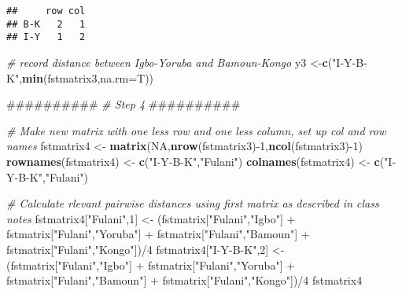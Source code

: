 \documentclass[]{article}
\newenvironment{Shaded}{\begin{snugshade}}{\end{snugshade}}
\newcommand{\KeywordTok}[1]{\textcolor[rgb]{0.13,0.29,0.53}{\textbf{{#1}}}}
\newcommand{\DataTypeTok}[1]{\textcolor[rgb]{0.13,0.29,0.53}{{#1}}}
\newcommand{\DecValTok}[1]{\textcolor[rgb]{0.00,0.00,0.81}{{#1}}}
\newcommand{\StringTok}[1]{\textcolor[rgb]{0.31,0.60,0.02}{{#1}}}
\newcommand{\CommentTok}[1]{\textcolor[rgb]{0.56,0.35,0.01}{\textit{{#1}}}}
\newcommand{\OtherTok}[1]{\textcolor[rgb]{0.56,0.35,0.01}{{#1}}}
\newcommand{\NormalTok}[1]{{#1}}
\begin{document}
\begin{verbatim}
##     row col
## B-K   2   1
## I-Y   1   2
\end{verbatim}

\begin{Shaded}
\begin{Highlighting}[]
\CommentTok{# record distance between Igbo-Yoruba and Bamoun-Kongo}
\NormalTok{y3 <-}\KeywordTok{c}\NormalTok{(}\StringTok{"I-Y-B-K"}\NormalTok{,}\KeywordTok{min}\NormalTok{(fstmatrix3,}\DataTypeTok{na.rm=}\NormalTok{T))}

\NormalTok{##########}
\CommentTok{# Step 4}
\NormalTok{##########}

\CommentTok{# Make new matrix with one less row and one less column, set up col and row names}
\NormalTok{fstmatrix4 <-}\StringTok{ }\KeywordTok{matrix}\NormalTok{(}\OtherTok{NA}\NormalTok{,}\KeywordTok{nrow}\NormalTok{(fstmatrix3)-}\DecValTok{1}\NormalTok{,}\KeywordTok{ncol}\NormalTok{(fstmatrix3)-}\DecValTok{1}\NormalTok{)}
\KeywordTok{rownames}\NormalTok{(fstmatrix4) <-}\StringTok{ }\KeywordTok{c}\NormalTok{(}\StringTok{"I-Y-B-K"}\NormalTok{,}\StringTok{"Fulani"}\NormalTok{)}
\KeywordTok{colnames}\NormalTok{(fstmatrix4) <-}\StringTok{ }\KeywordTok{c}\NormalTok{(}\StringTok{"I-Y-B-K"}\NormalTok{,}\StringTok{"Fulani"}\NormalTok{)}

\CommentTok{# Calculate rlevant pairwise distances using first matrix as described in class notes}
\NormalTok{fstmatrix4[}\StringTok{"Fulani"}\NormalTok{,}\DecValTok{1}\NormalTok{] <-}\StringTok{ }\NormalTok{(fstmatrix[}\StringTok{"Fulani"}\NormalTok{,}\StringTok{"Igbo"}\NormalTok{] +}\StringTok{ }\NormalTok{fstmatrix[}\StringTok{"Fulani"}\NormalTok{,}\StringTok{"Yoruba"}\NormalTok{] }
                           \NormalTok{+}\StringTok{ }\NormalTok{fstmatrix[}\StringTok{"Fulani"}\NormalTok{,}\StringTok{"Bamoun"}\NormalTok{] +}\StringTok{ }\NormalTok{fstmatrix[}\StringTok{"Fulani"}\NormalTok{,}\StringTok{"Kongo"}\NormalTok{])/}\DecValTok{4}
\NormalTok{fstmatrix4[}\StringTok{"I-Y-B-K"}\NormalTok{,}\DecValTok{2}\NormalTok{] <-}\StringTok{ }\NormalTok{(fstmatrix[}\StringTok{"Fulani"}\NormalTok{,}\StringTok{"Igbo"}\NormalTok{] +}\StringTok{ }\NormalTok{fstmatrix[}\StringTok{"Fulani"}\NormalTok{,}\StringTok{"Yoruba"}\NormalTok{] }
                           \NormalTok{+}\StringTok{ }\NormalTok{fstmatrix[}\StringTok{"Fulani"}\NormalTok{,}\StringTok{"Bamoun"}\NormalTok{] +}\StringTok{ }\NormalTok{fstmatrix[}\StringTok{"Fulani"}\NormalTok{,}\StringTok{"Kongo"}\NormalTok{])/}\DecValTok{4}
\NormalTok{fstmatrix4}
\end{Highlighting}
\end{Shaded}
\end{document}
